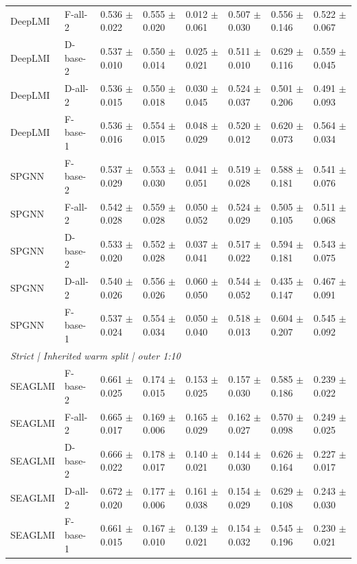 \begin{landscape}
{\begin{longtable}{llllllll}
DeepLMI & F-all-2 & 0.536 $\pm$ 0.022 & 0.555 $\pm$ 0.020 & 0.012 $\pm$ 0.061 & 0.507 $\pm$ 0.030 & 0.556 $\pm$ 0.146 & 0.522 $\pm$ 0.067 \\
DeepLMI & D-base-2 & 0.537 $\pm$ 0.010 & 0.550 $\pm$ 0.014 & 0.025 $\pm$ 0.021 & 0.511 $\pm$ 0.010 & 0.629 $\pm$ 0.116 & 0.559 $\pm$ 0.045 \\
DeepLMI & D-all-2 & 0.536 $\pm$ 0.015 & 0.550 $\pm$ 0.018 & 0.030 $\pm$ 0.045 & 0.524 $\pm$ 0.037 & 0.501 $\pm$ 0.206 & 0.491 $\pm$ 0.093 \\
DeepLMI & F-base-1 & 0.536 $\pm$ 0.016 & 0.554 $\pm$ 0.015 & 0.048 $\pm$ 0.029 & 0.520 $\pm$ 0.012 & 0.620 $\pm$ 0.073 & 0.564 $\pm$ 0.034 \\
SPGNN & F-base-2 & 0.537 $\pm$ 0.029 & 0.553 $\pm$ 0.030 & 0.041 $\pm$ 0.051 & 0.519 $\pm$ 0.028 & 0.588 $\pm$ 0.181 & 0.541 $\pm$ 0.076 \\
SPGNN & F-all-2 & 0.542 $\pm$ 0.028 & 0.559 $\pm$ 0.028 & 0.050 $\pm$ 0.052 & 0.524 $\pm$ 0.029 & 0.505 $\pm$ 0.105 & 0.511 $\pm$ 0.068 \\
SPGNN & D-base-2 & 0.533 $\pm$ 0.020 & 0.552 $\pm$ 0.028 & 0.037 $\pm$ 0.041 & 0.517 $\pm$ 0.022 & 0.594 $\pm$ 0.181 & 0.543 $\pm$ 0.075 \\
SPGNN & D-all-2 & 0.540 $\pm$ 0.026 & 0.556 $\pm$ 0.026 & 0.060 $\pm$ 0.050 & 0.544 $\pm$ 0.052 & 0.435 $\pm$ 0.147 & 0.467 $\pm$ 0.091 \\
SPGNN & F-base-1 & 0.537 $\pm$ 0.024 & 0.554 $\pm$ 0.034 & 0.050 $\pm$ 0.040 & 0.518 $\pm$ 0.013 & 0.604 $\pm$ 0.207 & 0.545 $\pm$ 0.092 \\
\multicolumn{8}{l}{\textit{Strict | Inherited warm split | outer 1:10}}\\
SEAGLMI & F-base-2 & 0.661 $\pm$ 0.025 & 0.174 $\pm$ 0.015 & 0.153 $\pm$ 0.025 & 0.157 $\pm$ 0.030 & 0.585 $\pm$ 0.186 & 0.239 $\pm$ 0.022 \\
SEAGLMI & F-all-2 & 0.665 $\pm$ 0.017 & 0.169 $\pm$ 0.006 & 0.165 $\pm$ 0.029 & 0.162 $\pm$ 0.027 & 0.570 $\pm$ 0.098 & 0.249 $\pm$ 0.025 \\
SEAGLMI & D-base-2 & 0.666 $\pm$ 0.022 & 0.178 $\pm$ 0.017 & 0.140 $\pm$ 0.021 & 0.144 $\pm$ 0.030 & 0.626 $\pm$ 0.164 & 0.227 $\pm$ 0.017 \\
SEAGLMI & D-all-2 & 0.672 $\pm$ 0.020 & 0.177 $\pm$ 0.006 & 0.161 $\pm$ 0.038 & 0.154 $\pm$ 0.029 & 0.629 $\pm$ 0.108 & 0.243 $\pm$ 0.030 \\
SEAGLMI & F-base-1 & 0.661 $\pm$ 0.015 & 0.167 $\pm$ 0.010 & 0.139 $\pm$ 0.021 & 0.154 $\pm$ 0.032 & 0.545 $\pm$ 0.196 & 0.230 $\pm$ 0.021 \\

\end{longtable}}
\end{landscape}
